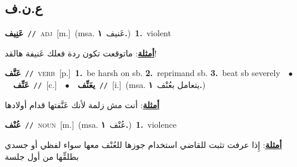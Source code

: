 \documentclass[10pt,a4paper,twoside]{article} %
\begin{document}
\begin{multicols}{2}
\vspace{-3mm}
\subsection*{\color{blue}\foreignlanguage{arabic}{ع.ن.ف}\color{blue}{}} 

{\setlength\topsep{0pt}\textbf{\foreignlanguage{arabic}{عَنِيف}}\ {\color{gray}\texttt{//}\color{black}}\ \textsc{adj}\ [m.]\ \color{gray}(msa. \foreignlanguage{arabic}{عَنيف}~\foreignlanguage{arabic}{\textbf{١.}})\color{black}\ \textbf{1.}~violent\  \begin{flushright}\color{gray}\foreignlanguage{arabic}{\textbf{\underline{\foreignlanguage{arabic}{أمثلة}}}: ماتوقعت تكون ردة فعلك عَنيفة هالقد!}\end{flushright}\color{black}} \vspace{2mm}

{\setlength\topsep{0pt}\textbf{\foreignlanguage{arabic}{عَنَّف}}\ {\color{gray}\texttt{//}\color{black}}\ \textsc{verb}\ [p.]\ \textbf{1.}~be harsh on sb.  \textbf{2.}~reprimand sb.  \textbf{3.}~beat sb severely\ \ $\bullet$\ \ \setlength\topsep{0pt}\textbf{\foreignlanguage{arabic}{عَنِّف}}\ {\color{gray}\texttt{//}\color{black}}\ [c.]\ \ $\bullet$\ \ \setlength\topsep{0pt}\textbf{\foreignlanguage{arabic}{يعَنِّف}}\ {\color{gray}\texttt{//}\color{black}}\ [i.]\ \color{gray}(msa. \foreignlanguage{arabic}{يتعامل بعُنْف}~\foreignlanguage{arabic}{\textbf{١.}})\color{black}\  \begin{flushright}\color{gray}\foreignlanguage{arabic}{\textbf{\underline{\foreignlanguage{arabic}{أمثلة}}}: أنت مش زلمة لأنك عَنَّفتها قدام أولادها}\end{flushright}\color{black}} \vspace{2mm}

{\setlength\topsep{0pt}\textbf{\foreignlanguage{arabic}{عُنْف}}\ {\color{gray}\texttt{//}\color{black}}\ \textsc{noun}\ [m.]\ \color{gray}(msa. \foreignlanguage{arabic}{عُنْف}~\foreignlanguage{arabic}{\textbf{١.}})\color{black}\ \textbf{1.}~violence\  \begin{flushright}\color{gray}\foreignlanguage{arabic}{\textbf{\underline{\foreignlanguage{arabic}{أمثلة}}}: إِذا عرفت تثبت للقاضي استخدام جوزها للعُنْف معها سواء لفظي أو جسدي بطلقِّها من أول جلسة}\end{flushright}\color{black}} \vspace{2mm}


\end{multicols}
\end{document}
